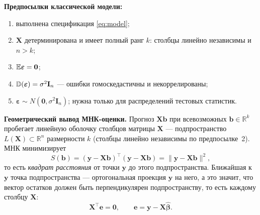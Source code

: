 \textbf{Предпосылки классической модели:}
\begin{enumerate}[label=\arabic*), leftmargin=2.2em, itemsep=2pt]
  \item выполнена спецификация \eqref{eq:model};
  \item $\mathbf{X}$ детерминирована и имеет полный ранг $k$: столбцы линейно
        независимы и $n > k$;
  \item[3a)] $\mathbb{E}\boldsymbol{\varepsilon} = \mathbf{0}$;
  \item[3b)] $\mathbb{D}(\boldsymbol{\varepsilon}) = \sigma^2\mathbf{I}_n$ — ошибки
        гомоскедастичны и некоррелированы;
  \item[3c)] $\boldsymbol{\varepsilon} \sim N(\mathbf{0}, \sigma^2\mathbf{I}_n)$;
        нужна только для распределений тестовых статистик.
\end{enumerate}

\textbf{Геометрический вывод МНК-оценки.} Прогноз $\mathbf{X}\mathbf{b}$ при
всевозможных $\mathbf{b} \in \mathbb{R}^k$ пробегает линейную оболочку столбцов
матрицы $\mathbf{X}$ — подпространство $L(\mathbf{X}) \subset \mathbb{R}^n$
размерности $k$ (столбцы линейно независимы по предпосылке~2). МНК минимизирует
\[
  S(\mathbf{b}) = (\mathbf{y} - \mathbf{X}\mathbf{b})^{\top}(\mathbf{y} - \mathbf{X}\mathbf{b})
                = \bigl\|\mathbf{y} - \mathbf{X}\mathbf{b}\bigr\|^2 ,
\]
то есть \emph{квадрат расстояния} от точки $\mathbf{y}$ до этого подпространства.
Ближайшая к $\mathbf{y}$ точка подпространства — ортогональная проекция
$\mathbf{y}$ на него, а это значит, что вектор остатков должен быть
перпендикулярен подпространству, то есть каждому столбцу $\mathbf{X}$:
\begin{equation}
  \mathbf{X}^{\top}\mathbf{e} = \mathbf{0},
  \qquad
  \mathbf{e} = \mathbf{y} - \mathbf{X}\widehat{\boldsymbol{\beta}} .
  \label{eq:normal}
\end{equation}

